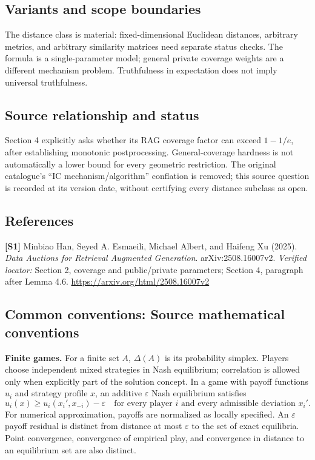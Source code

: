 \documentclass[11pt,a4paper]{article}
\begin{document}
\subsection*{Variants and scope boundaries}
The distance class is material: fixed-dimensional Euclidean distances, arbitrary metrics, and arbitrary similarity matrices need separate status checks. The formula is a single-parameter model; general private coverage weights are a different mechanism problem. Truthfulness in expectation does not imply universal truthfulness.
\subsection*{Source relationship and status}
Section 4 explicitly asks whether its RAG coverage factor can exceed $1-1/e$, after establishing monotonic postprocessing. General-coverage hardness is not automatically a lower bound for every geometric restriction. The original catalogue's ``IC mechanism/algorithm'' conflation is removed; this source question is recorded at its version date, without certifying every distance subclass as open.
\subsection*{References}
\begingroup\footnotesize\raggedright
\textbf{[S1]} Minbiao Han, Seyed A. Esmaeili, Michael Albert, and Haifeng Xu (2025). \emph{Data Auctions for Retrieval Augmented Generation}. arXiv:2508.16007v2. \textit{Verified locator:} Section 2, coverage and public/private parameters; Section 4, paragraph after Lemma 4.6. \url{https://arxiv.org/html/2508.16007v2}
\par\endgroup

\subsection*{Common conventions: Source mathematical conventions}

\textbf{Finite games.} For a finite set $A$, $\Delta(A)$ is its probability
simplex. Players choose independent mixed strategies in Nash equilibrium;
correlation is allowed only when explicitly part of the solution concept.
In a game with payoff functions $u_i$ and strategy profile $x$, an additive
$\varepsilon$ Nash equilibrium satisfies
\[
 u_i(x)\geq u_i(x_i',x_{-i})-\varepsilon
 \quad\text{for every player $i$ and every admissible deviation $x_i'$}.
\]
For numerical approximation, payoffs are normalized as locally specified.
An $\varepsilon$ payoff residual is distinct from distance at most
$\varepsilon$ to the set of exact equilibria. Point convergence, convergence
of empirical play, and convergence in distance to an equilibrium set are
also distinct.
\end{document}
